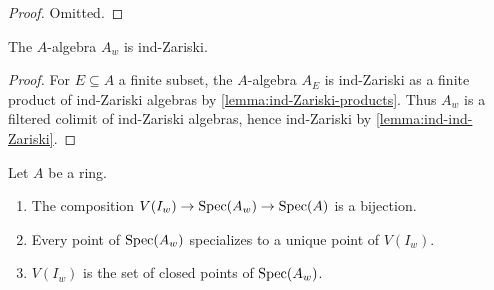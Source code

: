 \begin{proof}
  \leanok
  Omitted.
\end{proof}

\begin{lemma}
    The $A$-algebra $A_{w}$ is ind-Zariski.
    \label{lemma:w-localization-ind-Zariski}
    \leanok
\end{lemma}

\begin{proof}
    \leanok
    For $E \subseteq A$ a finite subset, the $A$-algebra $A_E$ is ind-Zariski
    as a finite product of ind-Zariski algebras by \ref{lemma:ind-Zariski-products}.
    Thus $A_w$ is a filtered colimit of ind-Zariski algebras, hence ind-Zariski
    by \ref{lemma:ind-ind-Zariski}.
\end{proof}

\begin{lemma}
    \label{lemma:w-localization-closed-points}
    \leanok
    Let $A$ be a ring.
    \begin{enumerate}
        \item The composition $V(I_w) \to \mathrm{Spec}(A_w) \to \mathrm{Spec}(A)$ is a bijection.
            \label{item:w-localization-bijection}
        \item Every point of $\mathrm{Spec}(A_w)$ specializes to a unique point of $V(I_w)$. \label{item:w-localization-specializes}
        \item $V(I_w)$ is the set of closed points of $\mathrm{Spec}(A_w)$. \label{item:w-localization-closed-points}
    \end{enumerate}
\end{lemma}


